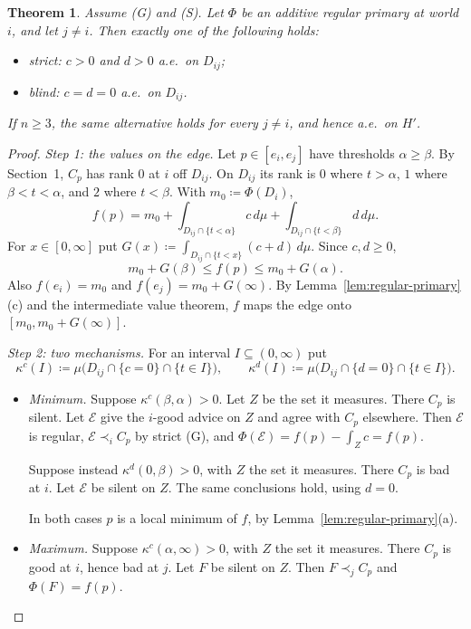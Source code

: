 \documentclass[11pt]{article}
\newtheorem{theorem}{Theorem}
\theoremstyle{remark}\newtheorem{remark}[theorem]{Remark}
\newcommand{\Escr}{\mathcal E}
\begin{document}
\begin{theorem}\label{thm:dichotomy}
Assume (G) and (S). Let $\Phi$ be an additive regular primary at world $i$,
and let $j\ne i$. Then exactly one of the following holds:
\begin{itemize}[leftmargin=*,itemsep=1pt]
\item \emph{strict:} $c>0$ and $d>0$ a.e.\ on $D_{ij}$;
\item \emph{blind:} $c=d=0$ a.e.\ on $D_{ij}$.
\end{itemize}
If $n\ge3$, the same alternative holds for every $j\ne i$, and hence a.e.\ on
$H'$.
\end{theorem}
\begin{proof}
\emph{Step 1: the values on the edge.} Let $p\in[e_i,e_j]$ have thresholds
$\alpha\ge\beta$. By Section~1, $C_p$ has rank $0$ at $i$ off $D_{ij}$. On
$D_{ij}$ its rank is $0$ where $t>\alpha$, $1$ where $\beta<t<\alpha$, and $2$
where $t<\beta$. With $m_0\coloneqq\Phi(D_i)$,
\[
 f(p)=m_0+\int_{D_{ij}\cap\{t<\alpha\}}c\,d\mu
 +\int_{D_{ij}\cap\{t<\beta\}}d\,d\mu.
\]
For $x\in[0,\infty]$ put $G(x)\coloneqq\int_{D_{ij}\cap\{t<x\}}(c+d)\,d\mu$.
Since $c,d\ge0$,
\begin{equation}
 m_0+G(\beta)\le f(p)\le m_0+G(\alpha).
 \label{eq:sandwich}
\end{equation}
Also $f(e_i)=m_0$ and $f(e_j)=m_0+G(\infty)$. By
Lemma~\ref{lem:regular-primary}(c) and the intermediate value theorem, $f$
maps the edge onto $[m_0,m_0+G(\infty)]$.

\emph{Step 2: two mechanisms.} For an interval $I\subseteq(0,\infty)$ put
\[
 \kappa^c(I)\coloneqq\mu\bigl(D_{ij}\cap\{c=0\}\cap\{t\in I\}\bigr),\qquad
 \kappa^d(I)\coloneqq\mu\bigl(D_{ij}\cap\{d=0\}\cap\{t\in I\}\bigr).
\]
\begin{itemize}[leftmargin=*,itemsep=2pt]
\item \emph{Minimum.} Suppose $\kappa^c(\beta,\alpha)>0$. Let $Z$ be the set
it measures. There $C_p$ is silent. Let $\Escr$ give the $i$-good advice on
$Z$ and agree with $C_p$ elsewhere. Then $\Escr$ is regular,
$\Escr\prec_iC_p$ by strict (G), and $\Phi(\Escr)=f(p)-\int_Zc=f(p)$.

Suppose instead $\kappa^d(0,\beta)>0$, with $Z$ the set it measures. There
$C_p$ is bad at $i$. Let $\Escr$ be silent on $Z$. The same conclusions hold,
using $d=0$.

In both cases $p$ is a local minimum of $f$, by
Lemma~\ref{lem:regular-primary}(a).
\item \emph{Maximum.} Suppose $\kappa^c(\alpha,\infty)>0$, with $Z$ the set
it measures. There $C_p$ is good at $i$, hence bad at $j$. Let $F$ be silent
on $Z$. Then $F\prec_jC_p$ and $\Phi(F)=f(p)$.


\end{itemize}
\end{proof}
\end{document}
